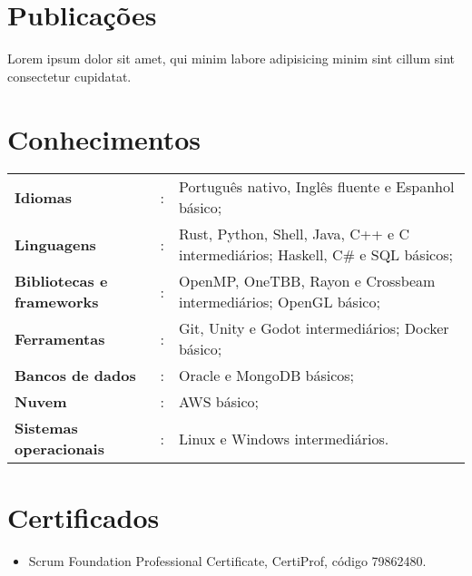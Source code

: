 \documentclass[11pt]{article}
\begin{document}
\section*{Publicações}

Lorem ipsum dolor sit amet, qui minim labore adipisicing minim sint cillum sint consectetur cupidatat.

\section*{Conhecimentos}

\begin{tabular}{ l@{} c l }
	\textbf{Idiomas} &:&Português nativo, Inglês fluente e Espanhol básico;\\
	\textbf{Linguagens} &:&Rust, Python, Shell, Java, C++ e C intermediários; Haskell, C\# e SQL básicos;\\
	\textbf{Bibliotecas e frameworks} &:&OpenMP, OneTBB, Rayon e Crossbeam intermediários; OpenGL básico;\\
	\textbf{Ferramentas} &:&Git, Unity e Godot intermediários; Docker básico;\\
	\textbf{Bancos de dados} &:&Oracle e MongoDB básicos;\\
	\textbf{Nuvem} &:&AWS básico;\\
	\textbf{Sistemas operacionais} &:&Linux e Windows intermediários.\\
\end{tabular}

\section*{Certificados}

\begin{itemize}
	\item Scrum Foundation Professional Certificate, CertiProf, código 79862480.
\end{itemize}
\end{document}

